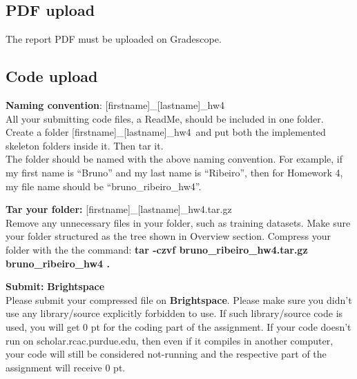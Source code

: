 \documentclass{article}
\newcommand{\homeworknumber}{4}
\begin{document}
%
\hfill

%
\subsection*{\bf PDF upload}
%
The report PDF must be uploaded on Gradescope.

%
\hfill

%
\subsection*{\bf Code upload}
%
\noindent \textbf{Naming convention}:
%
[firstname]\_[lastname]\_hw\homeworknumber
\\
%
All your submitting code files, a ReadMe, should be included in one folder. Create a folder [firstname]\_[lastname]\_hw\homeworknumber \ and put both the implemented skeleton folders inside it. Then tar it.\\
%
The folder should be named with the above naming convention.
%
For example, if my first name is ``Bruno'' and my last name is ``Ribeiro'',
then for Homework \homeworknumber, my file name should be
``bruno\_ribeiro\_hw\homeworknumber''.

%
\hfill

%
\noindent \textbf{Tar your folder:}
%
[firstname]\_[lastname]\_hw\homeworknumber.tar.gz
\\
%
Remove any unnecessary files in your folder, such as training datasets.
%
Make sure your folder structured as the tree shown in Overview section.
%
Compress your folder with the the command:
%
\textbf{
    tar -czvf bruno\_ribeiro\_hw\homeworknumber.tar.gz bruno\_ribeiro\_hw\homeworknumber
.}

%
\hfill

%
\noindent \textbf{Submit:}
%
{\bf Brightspace}
\\
%
Please submit your compressed file on \textbf{Brightspace}.
%
Please make sure you didn't use any library/source explicitly forbidden to use.
%
If such library/source code is used, you will get 0 pt for the coding part of
the assignment.
%
If your code doesn't run on scholar.rcac.purdue.edu, then even if it compiles
in another computer, your code will still be considered not-running and the
respective part of the assignment will receive 0 pt.
\end{document}
